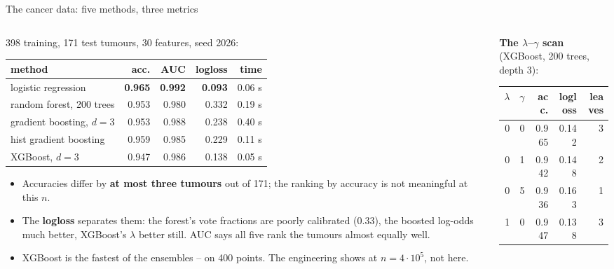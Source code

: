 \documentclass[10pt,aspectratio=169]{beamer}
\begin{document}
\begin{frame}{The cancer data: five methods, three metrics}
\begin{columns}[T]
\begin{column}{0.56\textwidth}
\footnotesize
398 training, 171 test tumours, 30 features, seed 2026:
\begin{center}\scriptsize
\begin{tabular}{@{}lrrrr@{}}
\toprule
method & acc. & AUC & logloss & time\\
\midrule
logistic regression & \textbf{0.965} & \textbf{0.992} & \textbf{0.093} & 0.06 s\\
random forest, 200 trees        & 0.953 & 0.980 & 0.332 & 0.19 s\\
gradient boosting, $d=3$ & 0.953 & 0.988 & 0.238 & 0.40 s\\
hist gradient boosting & 0.959 & 0.985 & 0.229 & 0.11 s\\
XGBoost, $d=3$ & 0.947 & 0.986 & 0.138 & 0.05 s\\
\bottomrule
\end{tabular}
\end{center}
\begin{itemize}
  \item Accuracies differ by \textbf{at most three tumours} out of 171; the
    ranking by accuracy is not meaningful at this $n$.
  \item The \textbf{logloss} separates them: the forest's vote fractions are
    poorly calibrated ($0.33$), the boosted log-odds much better, XGBoost's
    $\lambda$ better still.  AUC says all five rank the tumours almost
    equally well.
  \item XGBoost is the fastest of the ensembles -- on 400 points.  The
    engineering shows at $n=4\cdot10^5$, not here.
\end{itemize}
\end{column}
\begin{column}{0.44\textwidth}
\footnotesize
\textbf{The $\lambda$--$\gamma$ scan} (XGBoost, 200 trees, depth 3):
\begin{center}\scriptsize
\begin{tabular}{@{}rrrrr@{}}
\toprule
$\lambda$ & $\gamma$ & acc. & logloss & leaves\\
\midrule
0  & 0 & 0.965 & 0.142 & 3\\
0  & 1 & 0.942 & 0.148 & 2\\
0  & 5 & 0.936 & 0.163 & 1\\
1  & 0 & 0.947 & 0.138 & 3\\

\end{tabular}
\end{center}
\end{column}
\end{columns}
\end{frame}
\end{document}
